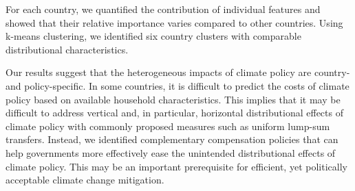 \documentclass[12pt, a4paper]{article}
\begin{document}
For each country, we quantified the contribution of individual features and showed that their relative importance varies compared to other countries. Using k-means clustering, we identified six country clusters with comparable distributional characteristics.

Our results suggest that the heterogeneous impacts of climate policy are country- and policy-specific. In some countries, it is difficult to predict the costs of climate policy based on available household characteristics. This implies that it may be difficult to address vertical and, in particular, horizontal distributional effects of climate policy with commonly proposed measures such as uniform lump-sum transfers. Instead, we identified complementary compensation policies that can help governments more effectively ease the unintended distributional effects of climate policy. This may be an important prerequisite for efficient, yet politically acceptable climate change mitigation. 

\clearpage

\begin{refcontext}[sorting=nyt]
\printbibliography
\end{refcontext}

\clearpage
\end{document}
